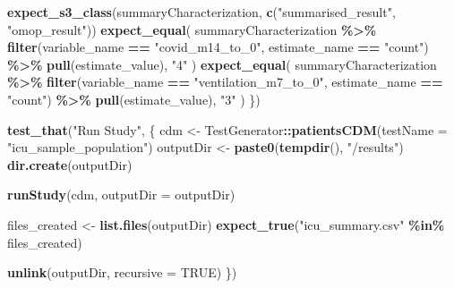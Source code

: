 \documentclass[
]{article}
\newenvironment{Shaded}{\begin{snugshade}}{\end{snugshade}}
\newcommand{\AttributeTok}[1]{\textcolor[rgb]{0.13,0.29,0.53}{#1}}
\newcommand{\ConstantTok}[1]{\textcolor[rgb]{0.56,0.35,0.01}{#1}}
\newcommand{\FunctionTok}[1]{\textcolor[rgb]{0.13,0.29,0.53}{\textbf{#1}}}
\newcommand{\NormalTok}[1]{#1}
\newcommand{\OtherTok}[1]{\textcolor[rgb]{0.56,0.35,0.01}{#1}}
\newcommand{\SpecialCharTok}[1]{\textcolor[rgb]{0.81,0.36,0.00}{\textbf{#1}}}
\newcommand{\StringTok}[1]{\textcolor[rgb]{0.31,0.60,0.02}{#1}}
\begin{document}
\begin{Shaded}
\begin{Highlighting}[]
  \FunctionTok{expect\_s3\_class}\NormalTok{(summaryCharacterization, }\FunctionTok{c}\NormalTok{(}\StringTok{"summarised\_result"}\NormalTok{, }\StringTok{"omop\_result"}\NormalTok{))}
  \FunctionTok{expect\_equal}\NormalTok{(}
\NormalTok{    summaryCharacterization }\SpecialCharTok{\%\textgreater{}\%} 
      \FunctionTok{filter}\NormalTok{(variable\_name }\SpecialCharTok{==} \StringTok{"covid\_m14\_to\_0"}\NormalTok{, estimate\_name }\SpecialCharTok{==} \StringTok{"count"}\NormalTok{) }\SpecialCharTok{\%\textgreater{}\%} 
      \FunctionTok{pull}\NormalTok{(estimate\_value), }\StringTok{"4"}
\NormalTok{  )}
  \FunctionTok{expect\_equal}\NormalTok{(}
\NormalTok{    summaryCharacterization }\SpecialCharTok{\%\textgreater{}\%} 
      \FunctionTok{filter}\NormalTok{(variable\_name }\SpecialCharTok{==} \StringTok{"ventilation\_m7\_to\_0"}\NormalTok{, estimate\_name }\SpecialCharTok{==} \StringTok{"count"}\NormalTok{) }\SpecialCharTok{\%\textgreater{}\%} 
      \FunctionTok{pull}\NormalTok{(estimate\_value), }\StringTok{"3"}
\NormalTok{  )}
\NormalTok{\})}

\FunctionTok{test\_that}\NormalTok{(}\StringTok{"Run Study"}\NormalTok{, \{}
\NormalTok{  cdm }\OtherTok{\textless{}{-}}\NormalTok{ TestGenerator}\SpecialCharTok{::}\FunctionTok{patientsCDM}\NormalTok{(}\AttributeTok{testName =} \StringTok{"icu\_sample\_population"}\NormalTok{)}
\NormalTok{  outputDir }\OtherTok{\textless{}{-}} \FunctionTok{paste0}\NormalTok{(}\FunctionTok{tempdir}\NormalTok{(), }\StringTok{"/results"}\NormalTok{)}
  \FunctionTok{dir.create}\NormalTok{(outputDir)}
  
  \FunctionTok{runStudy}\NormalTok{(cdm, }\AttributeTok{outputDir =}\NormalTok{ outputDir)}
  
\NormalTok{  files\_created }\OtherTok{\textless{}{-}} \FunctionTok{list.files}\NormalTok{(outputDir)}
  \FunctionTok{expect\_true}\NormalTok{(}\StringTok{"icu\_summary.csv"} \SpecialCharTok{\%in\%}\NormalTok{ files\_created)}
  
  \FunctionTok{unlink}\NormalTok{(outputDir, }\AttributeTok{recursive =} \ConstantTok{TRUE}\NormalTok{)}
\NormalTok{\})}
\end{Highlighting}
\end{Shaded}
\end{document}
